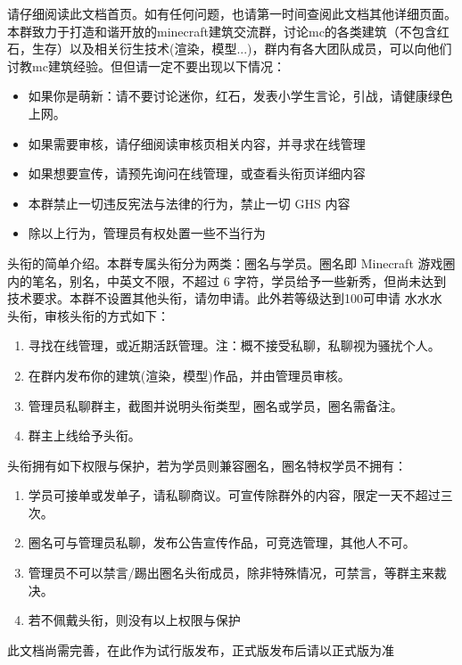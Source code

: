 \documentclass{TMR}
\begin{document}
\begin{coverletter}

请仔细阅读此文档首页。如有任何问题，也请第一时间查阅此文档其他详细页面。本群致力于打造和谐开放的minecraft建筑交流群，讨论mc的各类建筑（不包含红石，生存）以及相关衍生技术(渲染，模型...)，群内有各大团队成员，可以向他们讨教mc建筑经验。但但请一定不要出现以下情况：
\begin{itemize}
    \item 如果你是萌新：请不要讨论迷你，红石，发表小学生言论，引战，请健康绿色上网。
    \item 如果需要审核，请仔细阅读审核页相关内容，并寻求在线管理
    \item 如果想要宣传，请预先询问在线管理，或查看头衔页详细内容
    \item 本群禁止一切违反宪法与法律的行为，禁止一切 GHS 内容
    \item 除以上行为，管理员有权处置一些不当行为
\end{itemize}

头衔的简单介绍。本群专属头衔分为两类：圈名与学员。圈名即 Minecraft 游戏圈内的笔名，别名，中英文不限，不超过 6 字符，学员给予一些新秀，但尚未达到技术要求。本群不设置其他头衔，请勿申请。此外若等级达到100可申请 水水水 头衔，审核头衔的方式如下：
\begin{enumerate}
    \item 寻找在线管理，或近期活跃管理。注：概不接受私聊，私聊视为骚扰个人。
    \item 在群内发布你的建筑(渲染，模型)作品，并由管理员审核。
    \item 管理员私聊群主，截图并说明头衔类型，圈名或学员，圈名需备注。
    \item 群主上线给予头衔。
\end{enumerate} 

头衔拥有如下权限与保护，若为学员则兼容圈名，圈名特权学员不拥有：
\begin{enumerate}
    \item 学员可接单或发单子，请私聊商议。可宣传除群外的内容，限定一天不超过三次。
    \item 圈名可与管理员私聊，发布公告宣传作品，可竞选管理，其他人不可。
    \item 管理员不可以禁言/踢出圈名头衔成员，除非特殊情况，可禁言，等群主来裁决。
    \item 若不佩戴头衔，则没有以上权限与保护
\end{enumerate}

此文档尚需完善，在此作为试行版发布，正式版发布后请以正式版为准

\end{coverletter}
\end{document}
